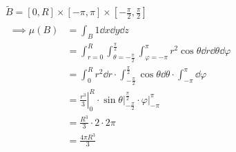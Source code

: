 \begin{bsp*}[note = Volumen der Kugel mit Radius $R$]
	\begin{gather*}
		\tilde{B} = [ 0 , R ] \times [ -\pi , \pi ] \times [ -\frac{\pi}{2} , \frac{\pi}{2} ] \\
		\begin{split}
			\implies \mu(B)
				&= \int_B 1 \dd x \dd y \dd z \\
				&= \int_{r=0}^R \int_{\theta=-\frac{\pi}{2}}^{\frac{\pi}{2}} \int_{\varphi=-\pi}^\pi r^2 \cos \theta \dd r \dd \theta \dd \varphi \\
				&= \int_0^R r^2 \dd r \cdot \int_{-\frac{\pi}{2}}^{\frac{\pi}{2}} \cos \theta \dd \theta \cdot \int_{-\pi}^\pi \dd \varphi \\
				&= \left. \frac{r^3}{3} \right|_0^R \cdot \left. \sin \theta \right|_{-\frac{\pi}{2}}^{\frac{\pi}{2}} \cdot \left. \varphi \right|_{-\pi}^\pi \\
				&= \frac{R^3}{3} \cdot 2 \cdot 2\pi \\
				&= \frac{4\pi R^3}{3}
		\end{split}
	\end{gather*}
\end{bsp*}
